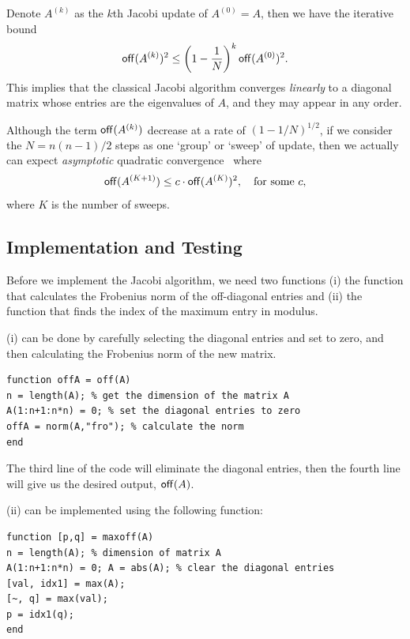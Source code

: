 Denote $A^{(k)}$ as the $k$th Jacobi update of $A^{(0)} = A$, then we have the iterative bound 
\begin{equation}
    \label{eq:3.3}
    \mathsf{off}(A^{(k)})^2 \leq \left(1 - \frac{1}{N}\right)^k \mathsf{off}(A^{(0)})^2.
\end{equation}
This implies that the classical Jacobi algorithm converges \emph{linearly} to a diagonal matrix whose entries are the eigenvalues of $A$, and they may appear in any order.

\begin{remark}
    Although the term $\mathsf{off}(A^{(k)})$ decrease at a rate of $(1-1/N)^{1/2}$, if we consider the $N = n(n-1)/2$ steps as one `group' or `sweep' of update, then we actually can expect \emph{asymptotic} quadratic convergence~ where 
    \begin{equation*}
        \mathsf{off}(A^{(K + 1)})\leq c\cdot \mathsf{off}(A^{(K)})^2, \quad \text{for some }c,
    \end{equation*}
    where $K$ is the number of sweeps.
\end{remark}

\subsection{Implementation and Testing}\label{sec:jacobi-imple-and-testing}

Before we implement the Jacobi algorithm, we need two functions (i) the function that calculates the Frobenius norm of the off-diagonal entries and (ii) the function that finds the index of the maximum entry in modulus.

(i) can be done by carefully selecting the diagonal entries and set to zero, and then calculating the Frobenius norm of the new matrix.
\begin{lstlisting}
function offA = off(A)
n = length(A); % get the dimension of the matrix A
A(1:n+1:n*n) = 0; % set the diagonal entries to zero
offA = norm(A,"fro"); % calculate the norm
end
\end{lstlisting}
The third line of the code will eliminate the diagonal entries, then the fourth line will give us the desired output, $\mathsf{off}(A)$.

(ii) can be implemented using the following function:
\begin{lstlisting}
function [p,q] = maxoff(A)
n = length(A); % dimension of matrix A
A(1:n+1:n*n) = 0; A = abs(A); % clear the diagonal entries
[val, idx1] = max(A);
[~, q] = max(val);
p = idx1(q);
end
\end{lstlisting}

